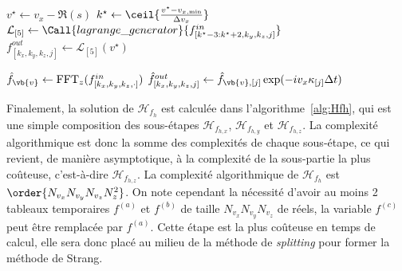 \begin{itemize}
\begin{algorithm}
\begin{algorithmic}[1]
              \State $v^{\star} \gets v_x - \Re(s)$
              \State $k^{\star} \gets \ceil{\frac{ v^{\star}-v_{x,\text{min}} }{ \Delta v_x }}$
              \State $\mathcal{L}_{[5]} \gets \Call{lagrange\_generator}{f^{in}_{[k^\star-3:k^\star+2,k_y,k_z,j]}}$
              \State $f^{out}_{[k_x,k_y,k_z,j]} \gets \mathcal{L}_{[5]}( v^{\star} )$
            \EndFor
          \EndFor
        \EndFunction

          \vspace{0.25cm}

          \ForAll{$(k_x,k_y,k_z)\in[\![0,N_{v_x}[\![\times[\![0,N_{v_y}[\![\times[\![0,N_{v_z}[\![$}
            \State $\hat{f}_{\vb{v}} \gets \text{FFT}_z(f^{in}_{[k_x,k_y,k_z,\cdot]})$
              \State $\hat{f}^{out}_{[k_x,k_y,k_z,j]} \gets \hat{f}_{\vb{v},[j]}\exp(-iv_x\kappa_{[j]}\Delta t)$
            \EndFor
          \EndFor
        \EndFunction

          \vspace{0.25cm}

          \State {}
          \State {}
          \State {}
        \EndFunction
      \end{algorithmic}
    \end{algorithm}
\end{itemize}

Finalement, la solution de $\mathcal{H}_{f_h}$ est calculée dans l'algorithme~\ref{alg:Hfh}, qui est une simple composition des sous-étapes $\mathcal{H}_{f_{h,x}}$, $\mathcal{H}_{f_{h,y}}$ et $\mathcal{H}_{f_{h,z}}$. La complexité algorithmique est donc la somme des complexités de chaque sous-étape, ce qui revient, de manière asymptotique, à la complexité de la sous-partie la plus coûteuse, c'est-à-dire $\mathcal{H}_{f_{h,z}}$. La complexité algorithmique de $\mathcal{H}_{f_h}$ est $\order{N_{v_x}N_{v_y}N_{v_z}N_z^2}$. On note cependant la nécessité d'avoir au moins 2 tableaux temporaires $f^{(a)}$ et $f^{(b)}$ de taille $N_{v_x}N_{v_y}N_{v_z}$ de réels, la variable $f^{(c)}$ peut être remplacée par $f^{(a)}$. Cette étape est la plus coûteuse en temps de calcul, elle sera donc placé au milieu de la méthode de \emph{splitting} pour former la méthode de Strang.

